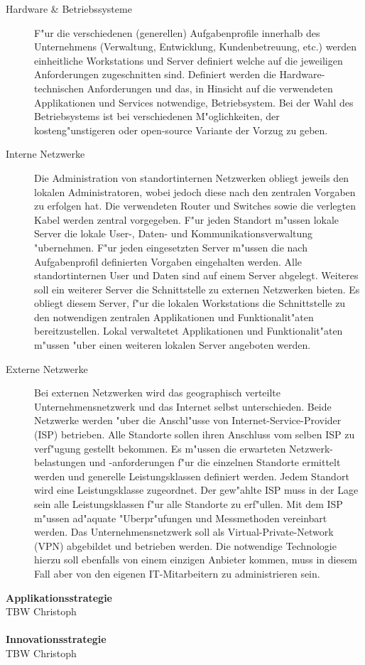\begin{description}

	\item[Hardware \& Betriebssysteme] F"ur die verschiedenen (generellen) Aufgabenprofile innerhalb des Unternehmens (Verwaltung, Entwicklung, Kundenbetreuung, etc.) werden einheitliche Workstations und Server definiert welche auf die jeweiligen Anforderungen zugeschnitten sind. Definiert werden die Hardware-technischen Anforderungen und das, in Hinsicht auf die verwendeten Applikationen und Services notwendige, Betriebsystem. Bei der Wahl des Betriebsystems ist bei verschiedenen M"oglichkeiten, der kosteng"unstigeren oder open-source Variante der Vorzug zu geben.
	
	\item[Interne Netzwerke] Die Administration von standortinternen Netzwerken obliegt jeweils den lokalen Administratoren, wobei jedoch diese nach den zentralen Vorgaben zu erfolgen hat. Die verwendeten Router und Switches sowie die verlegten Kabel werden zentral vorgegeben. F"ur jeden Standort m"ussen lokale Server die lokale User-, Daten- und Kommunikationsverwaltung "ubernehmen. F"ur jeden eingesetzten Server m"ussen die nach Aufgabenprofil definierten Vorgaben eingehalten werden. Alle standortinternen User und Daten sind auf einem Server abgelegt. Weiteres soll ein weiterer Server die Schnittstelle zu externen Netzwerken bieten. Es obliegt diesem Server, f"ur die lokalen Workstations die Schnittstelle zu den notwendigen zentralen Applikationen und Funktionalit"aten bereitzustellen. Lokal verwaltetet Applikationen und Funktionalit"aten m"ussen "uber einen weiteren lokalen Server angeboten werden.
	
	\item[Externe Netzwerke] Bei externen Netzwerken wird  das geographisch verteilte Unternehmensnetzwerk und das Internet selbst unterschieden. Beide Netzwerke werden "uber die Anschl"usse von Internet-Service-Provider (ISP) betrieben. Alle Standorte sollen ihren Anschluss vom selben ISP zu verf"ugung gestellt bekommen. Es m"ussen die erwarteten Netzwerk- belastungen und -anforderungen f"ur die einzelnen Standorte ermittelt werden und generelle Leistungsklassen definiert werden. Jedem Standort wird eine Leistungsklasse zugeordnet. Der gew"ahlte ISP muss in der Lage sein alle Leistungsklassen f"ur alle Standorte zu erf"ullen. Mit dem ISP m"ussen ad"aquate "Uberpr"ufungen und Messmethoden vereinbart werden. Das Unternehmensnetzwerk soll als Virtual-Private-Network (VPN) abgebildet und betrieben werden. Die notwendige Technologie hierzu soll ebenfalls von einem einzigen Anbieter kommen, muss in diesem Fall aber von den eigenen IT-Mitarbeitern zu administrieren sein.

\end{description}

\textbf{Applikationsstrategie}\\
TBW Christoph\\\\



\textbf{Innovationsstrategie}\\
TBW Christoph\\\\
